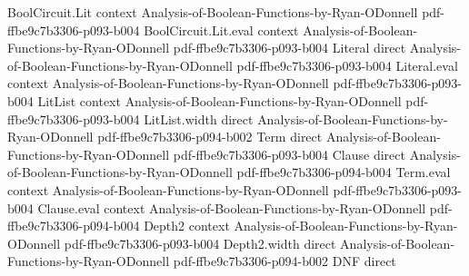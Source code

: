\begin{theorem}
\leanok
{}
\proofstep
  {BoolCircuit.Lit}
  {context}
  {Analysis-of-Boolean-Functions-by-Ryan-ODonnell}
  {pdf-ffbe9c7b3306-p093-b004}
\proofstep
  {BoolCircuit.Lit.eval}
  {context}
  {Analysis-of-Boolean-Functions-by-Ryan-ODonnell}
  {pdf-ffbe9c7b3306-p093-b004}
\proofstep
  {Literal}
  {direct}
  {Analysis-of-Boolean-Functions-by-Ryan-ODonnell}
  {pdf-ffbe9c7b3306-p093-b004}
\proofstep
  {Literal.eval}
  {context}
  {Analysis-of-Boolean-Functions-by-Ryan-ODonnell}
  {pdf-ffbe9c7b3306-p093-b004}
\proofstep
  {LitList}
  {context}
  {Analysis-of-Boolean-Functions-by-Ryan-ODonnell}
  {pdf-ffbe9c7b3306-p093-b004}
\proofstep
  {LitList.width}
  {direct}
  {Analysis-of-Boolean-Functions-by-Ryan-ODonnell}
  {pdf-ffbe9c7b3306-p094-b002}
\proofstep
  {Term}
  {direct}
  {Analysis-of-Boolean-Functions-by-Ryan-ODonnell}
  {pdf-ffbe9c7b3306-p093-b004}
\proofstep
  {Clause}
  {direct}
  {Analysis-of-Boolean-Functions-by-Ryan-ODonnell}
  {pdf-ffbe9c7b3306-p094-b004}
\proofstep
  {Term.eval}
  {context}
  {Analysis-of-Boolean-Functions-by-Ryan-ODonnell}
  {pdf-ffbe9c7b3306-p093-b004}
\proofstep
  {Clause.eval}
  {context}
  {Analysis-of-Boolean-Functions-by-Ryan-ODonnell}
  {pdf-ffbe9c7b3306-p094-b004}
\proofstep
  {Depth2}
  {context}
  {Analysis-of-Boolean-Functions-by-Ryan-ODonnell}
  {pdf-ffbe9c7b3306-p093-b004}
\proofstep
  {Depth2.width}
  {direct}
  {Analysis-of-Boolean-Functions-by-Ryan-ODonnell}
  {pdf-ffbe9c7b3306-p094-b002}
\proofstep
  {DNF}
  {direct}

\end{theorem}
